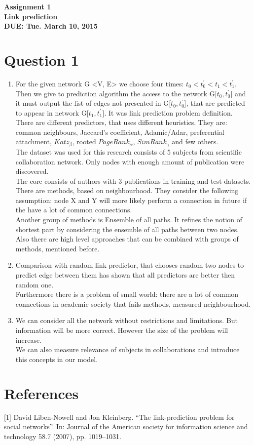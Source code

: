 \documentclass[12pt]{article}
\begin{document}


\begin{center}
\textbf{Assignment 1 \\
Link prediction \\
DUE: Tue. March 10, 2015 \\}
\end{center}

\section{Question 1}
\begin{enumerate}
\item
For the given network G <V, E> we choose four times: $t_0 < t_0^{'} < t_1 < t_1^{'}$. Then we give to prediction algorithm the access to the network G[$t_0, t_0^{'}$] and it must output the list of edges not presented in G[$t_0, t_0^{'}$], that are predicted to appear in network G[$t_1, t_1^{'}$]. It was link prediction problem definition.\\
There are different predictors, that uses different heuristics. They are: common neighbours, Jaccard's coefficient, Adamic/Adar, preferential attachment, $Katz_\beta$, rooted $PageRank_\alpha$, $SimRank_\gamma$ and few others.\\
The dataset was used for this research consists of 5 subjects from scientific collaboration network. Only nodes with enough amount of publication were discovered.\\
The core consists of authors with 3 publications in training and test datasets.\\
There are methods, based on neighbourhood. They consider the following assumption: node X and Y will more likely perform a connection in future if the have a lot of common connections.\\
Another group of methods is Ensemble of all paths. It refines the notion of shortest part by considering the ensemble of all paths between two nodes.\\
Also there are high level approaches that can be combined with groups of methods, mentioned before.
\item
Comparison with random link predictor, that chooses random two nodes to predict edge between them has shown that all predictors are better then random one.\\
Furthermore there is a problem of small world: there are a lot of common connections in academic society that fails methods, measured neighbourhood.
\item
We can consider all the network without restrictions and limitations.  But information will be more correct. However the size of the problem will increase.\\
We can also measure relevance of subjects in collaborations and introduce this concepts in our model. 
\end{enumerate}

\section{References}
[1] David Liben-Nowell and Jon Kleinberg. “The link-prediction problem for social networks”. In: Journal of the American society for information science and technology 58.7 (2007), pp. 1019–1031.
\end{document}
